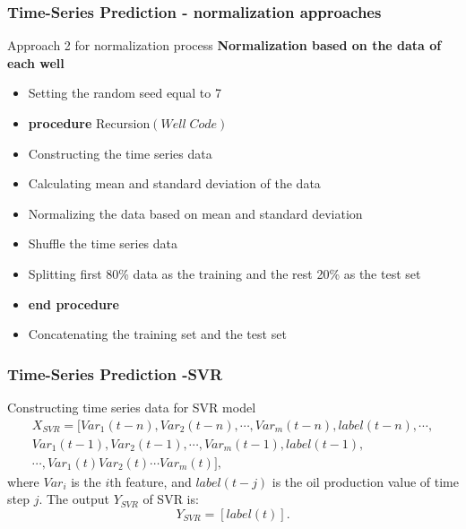 \documentclass[xcolor=table]{beamer}
\begin{document}
\begin{frame}
\frametitle{Time-Series Prediction - normalization approaches}

\begin{block}{Approach 2 for normalization process}
\textbf{Normalization based on the data of each well}
\begin{itemize}
\item Setting the random seed equal to 7
\item \textbf{procedure} Recursion$(Well\;Code)$
\item \hspace{5mm} Constructing the time series data
\item \hspace{5mm} Calculating mean and standard deviation of the data
\item \hspace{5mm} Normalizing the data based on mean and standard deviation
\item \hspace{5mm} Shuffle the time series data
\item \hspace{5mm} Splitting first 80\% data as the training and the rest 20\% as the test set
\item  \textbf{end procedure} 
\item Concatenating the training set and the test set
\end{itemize}

\end{block}

\end{frame}


\begin{frame}
\frametitle{Time-Series Prediction -SVR}

\begin{block}{Constructing time series data for SVR model}
\begin{equation}
\begin{split}
	X_{SVR} = [Var_1(t-n), Var_2(t-n), \cdots, Var_m(t-n), label(t-n), \cdots, 
	\\Var_1(t-1), Var_2(t-1), \cdots, Var_m(t-1), label(t-1), 
	\\ \cdots, Var_1(t)Var_2(t) \cdots Var_m(t)],
\end{split}
\end{equation}
where $Var_i$ is the $i$th feature, and $label(t-j)$ is the oil production value of time step $j$.
The output $Y_{SVR}$ of SVR is:
\begin{equation}
	Y_{SVR} = [label(t)].	
\end{equation}
\end{block}

\end{frame}
\end{document}

